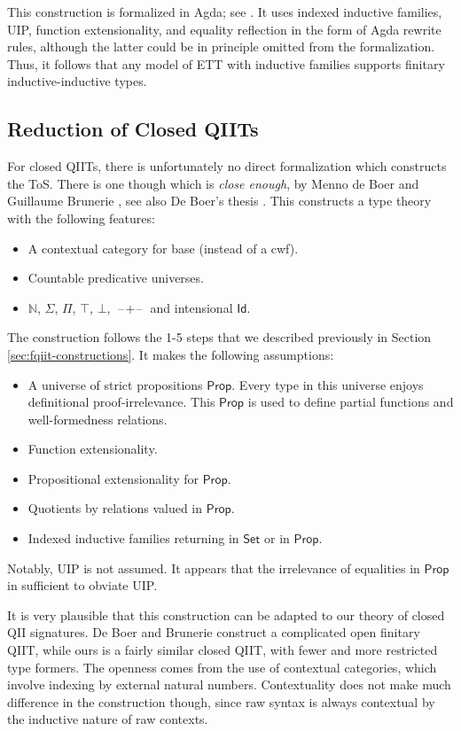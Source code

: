 \documentclass[12pt,a4paper,twoside,openany]{book}
\theoremstyle{remark}
\theoremstyle{definition}
\theoremstyle{theorem}
\newcommand{\ms}[1]{\mathsf{#1}}
\newcommand{\Id}{\mathsf{Id}}
\newcommand{\blank}{\mathord{\hspace{1pt}\text{--}\hspace{1pt}}}
\newcommand{\Set}{\mathsf{Set}}
\begin{document}
This construction is formalized in Agda; see \cite{ind-ind-reduction}. It uses
indexed inductive families, UIP, function extensionality, and equality
reflection in the form of Agda rewrite rules, although the latter could be in
principle omitted from the formalization. Thus, it follows that any model
of ETT with inductive families supports finitary inductive-inductive types.

\subsection{Reduction of Closed QIITs}

For closed QIITs, there is unfortunately no direct formalization which
constructs the ToS. There is one though which is \emph{close enough}, by Menno
de Boer and Guillaume Brunerie \cite{initiality-agda}, see also De Boer's thesis
\cite{deboer-initiality}. This constructs a type theory with the following
features:
\begin{itemize}
  \item A contextual category for base (instead of a cwf).
  \item Countable predicative universes.
  \item $\mathbb{N}$, $\Sigma$, $\Pi$, $\top$, $\bot$, $\blank\!+\!\blank$ and
        intensional $\Id$.
\end{itemize}
The construction follows the 1-5 steps that we described previously in Section \ref{sec:fqiit-constructions}. It makes the following assumptions:
\begin{itemize}
\item A universe of strict propositions $\ms{Prop}$. Every type in this universe
      enjoys definitional proof-irrelevance. This $\ms{Prop}$ is used to define
      partial functions and well-formedness relations.
\item Function extensionality.
\item Propositional extensionality for $\ms{Prop}$.
\item Quotients by relations valued in $\ms{Prop}$.
\item Indexed inductive families returning in $\Set$ or in $\ms{Prop}$.
\end{itemize}
Notably, UIP is not assumed. It appears that the irrelevance of equalities in
$\ms{Prop}$ in sufficient to obviate UIP.

It is very plausible that this construction can be adapted to our theory of
closed QII signatures. De Boer and Brunerie construct a complicated open
finitary QIIT, while ours is a fairly similar closed QIIT, with fewer and more
restricted type formers. The openness comes from the use of contextual
categories, which involve indexing by external natural numbers. Contextuality
does not make much difference in the construction though, since raw syntax is
always contextual by the inductive nature of raw contexts.
\end{document}
